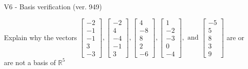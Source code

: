 \begin{exercise}
  \begin{exerciseTitle}V6 - Basis verification (ver. 949)\end{exerciseTitle}
  \begin{exerciseStatement}
    Explain why the vectors \(\left[\begin{array}{r}
-2 \\
-1 \\
-1 \\
3 \\
-3
\end{array}\right] , \left[\begin{array}{r}
-2 \\
4 \\
-4 \\
-1 \\
3
\end{array}\right] , \left[\begin{array}{r}
4 \\
-8 \\
8 \\
2 \\
-6
\end{array}\right] , \left[\begin{array}{r}
1 \\
-2 \\
-3 \\
0 \\
-4
\end{array}\right] , \text{ and } \left[\begin{array}{r}
-5 \\
5 \\
8 \\
3 \\
9
\end{array}\right]\) are or are not a basis of \(\mathbb{R}^5\)	



\end{exerciseStatement}
\end{exercise}
